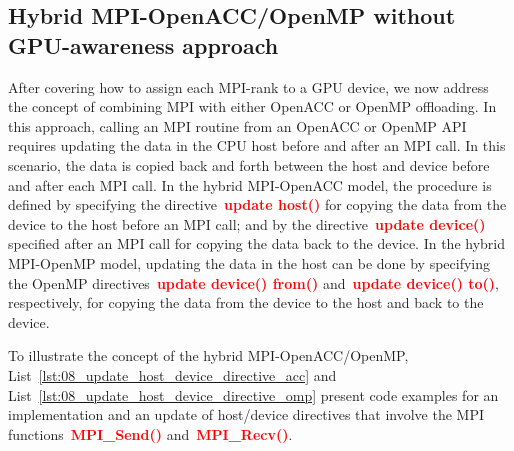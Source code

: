 







\subsection{Hybrid MPI-OpenACC/OpenMP without GPU-awareness approach}


\par
After covering how to assign each MPI-rank to a GPU device, we now address the concept of combining MPI with either OpenACC or OpenMP offloading.
In this approach, calling an MPI routine from an OpenACC or OpenMP API requires updating the data in the CPU host before and after an MPI call.
In this scenario, the data is copied back and forth between the host and device before and after each MPI call.
In the hybrid MPI-OpenACC model, the procedure is defined by specifying the directive~\textbf{\textcolor{red}{update host()}} for copying the data from the device to the host before an MPI call; and by the directive~\textbf{\textcolor{red}{update device()}} specified after an MPI call for copying the data back to the device.
In the hybrid MPI-OpenMP model, updating the data in the host can be done by specifying the OpenMP directives~\textbf{\textcolor{red}{update device() from()}} and~\textbf{\textcolor{red}{update device() to()}}, respectively, for copying the data from the device to the host and back to the device.


\par
To illustrate the concept of the hybrid MPI-OpenACC/OpenMP, List~\ref{lst:08_update_host_device_directive_acc} and List~\ref{lst:08_update_host_device_directive_omp} present code examples for an implementation and an update of host/device directives that involve the MPI functions~\textbf{\textcolor{red}{MPI\_Send()}} and~\textbf{\textcolor{red}{MPI\_Recv()}}.


